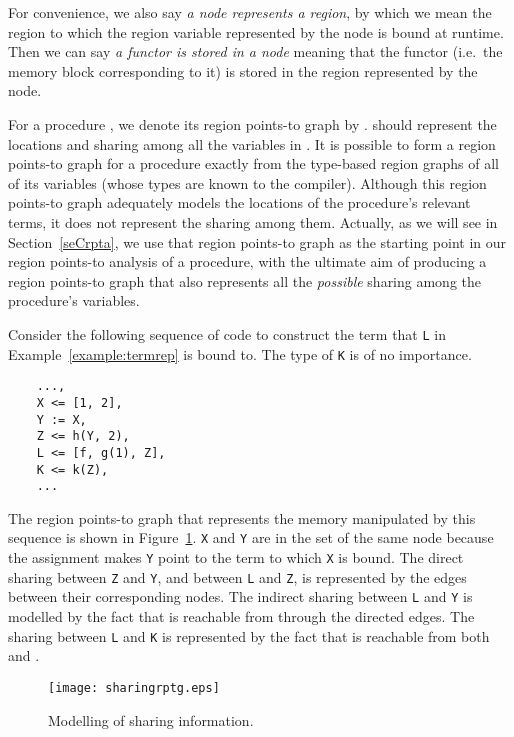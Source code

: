 \documentclass{tlp}
\newcommand{\code}[1]{{\tt#1}}
\begin{document}
For convenience, we also say \emph{a node represents a region},
by which we mean the region to which
the region variable represented by the node is bound at runtime.
Then we can say \emph{a functor is stored in a node} meaning
that the functor (i.e.\ the memory block corresponding to it)
is stored in the region represented by the node.

For a procedure ,
we denote its region points-to graph by .
 should represent the locations and sharing
among all the variables in .
It is possible to form a region points-to graph for a procedure
exactly from the type-based region graphs of all of its variables
(whose types are known to the compiler).
Although this region points-to graph adequately models
the locations of the procedure's relevant terms,
it does not represent the sharing among them.
Actually, as we will see in Section~\ref{seCrpta},
we use that region points-to graph as the starting point
in our region points-to analysis of a procedure,
with the ultimate aim of producing a region points-to graph
that also represents all the \emph{possible} sharing
among the procedure's variables.

\begin{example}
Consider the following sequence of code to construct the term
that \code{L} in Example~\ref{example:termrep} is bound to.
The type of \code{K} is of no importance.
\begin{verbatim}
    ...,
    X <= [1, 2],
    Y := X,
    Z <= h(Y, 2),
    L <= [f, g(1), Z],
    K <= k(Z),
    ...
\end{verbatim}
The region points-to graph that represents
the memory manipulated by this sequence is shown in Figure~\ref{fig:sharing}.
\code{X} and \code{Y} are in the  set of the same node
because the assignment makes \code{Y} point to the term
to which \code{X} is bound.
The direct sharing between \code{Z} and \code{Y},
and between \code{L} and \code{Z},
is represented by the edges between their corresponding nodes.
The indirect sharing between \code{L} and \code{Y} is modelled
by the fact that  is reachable from  through the directed edges.
The sharing between \code{L} and \code{K} is represented by the fact that
 is reachable from both  and .
\begin{figure}[htp]
\centering
\texttt{[image: sharingrptg.eps]}
\caption{Modelling of sharing information.}
\label{fig:sharing}
\end{figure}
\label{example:sharingrptg}
\hfill 
\end{example}
\end{document}
